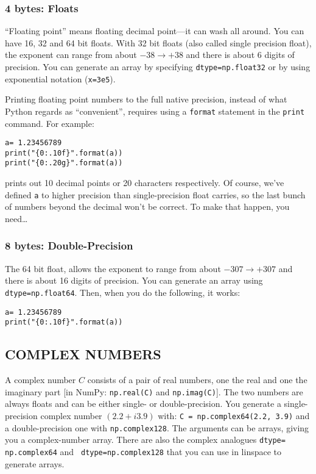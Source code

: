 \documentclass[psfig,preprint]{aastex}
\begin{document}
\subsubsection{4 bytes: Floats}

	``Floating point'' means floating decimal point---it can wash all
around.  You can have 16, 32 and 64 bit floats. With 32 bit floats (also 
called single precision float), the exponent can range from about 
$-38 \rightarrow+38$ and there is about 6 digits of precision.  You can 
generate an array by specifying {\tt dtype=np.float32} or by using 
exponential notation ({\tt x=3e5}).

	Printing floating point numbers to the full native precision,
instead of what Python regards as ``convenient'', requires using a 
\verb$format$ statement in the \verb$print$ command. For example:

\begin{verbatim}
a= 1.23456789
print("{0:.10f}".format(a))
print("{0:.20g}".format(a))
\end{verbatim}

\noindent prints out 10 decimal points or 20 characters respectively.  
Of course, we've defined \verb$a$ to higher precision
than single-precision float carries, so the last bunch of numbers beyond
the decimal won't be correct. To make that happen, you need\dots

\subsubsection{8 bytes: Double-Precision}

	The 64 bit float, allows the exponent to range from about $-307
\rightarrow +307$ and there is about 16 digits of precision.  You can 
generate an array using {\tt dtype=np.float64}. Then, when you do the
following, it works:

\begin{verbatim}
a= 1.23456789
print("{0:.10f}".format(a))
\end{verbatim}

\subsection{COMPLEX NUMBERS}

A complex number $C$ consists of a pair of real numbers, one the real and
one the imaginary part [in NumPy: {\tt np.real(C)} and {\tt np.imag(C)}].
The two numbers are always floats and can be either single- or
double-precision. You generate a single-precision complex number $(2.2 +
i3.9)$ with: {\tt C = np.complex64(2.2, 3.9)} and a double-precision 
one with {\tt np.complex128}. The arguments can be arrays, giving you a complex-number
array. There are also the complex analogues {\tt dtype= np.complex64} and {\tt
  dtype=np.complex128} that you can use in linspace to generate arrays.
\end{document}
